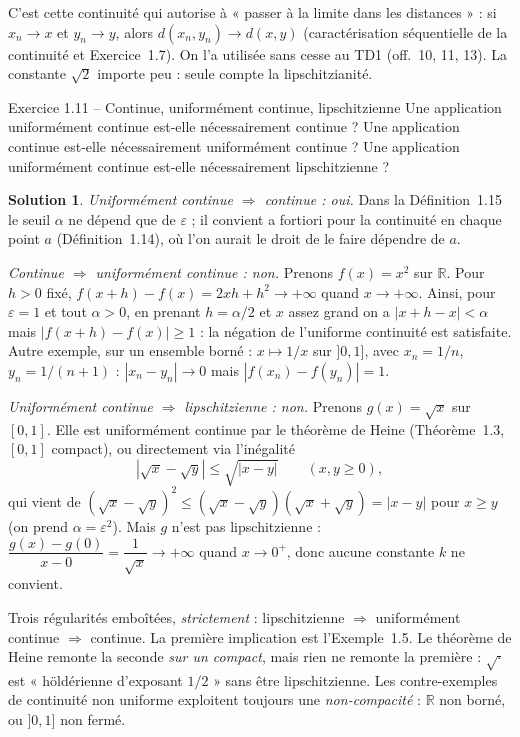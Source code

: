 \documentclass[11pt,a4paper]{article}
\newcommand{\R}{\mathbb{R}}
\newcommand{\abs}[1]{\left|#1\right|}
\theoremstyle{definition}
\newtheorem*{solution}{Solution}
\begin{document}
\begin{commentaire}
C'est cette continuité qui autorise à « passer à la limite dans les distances » : si $x_n\to x$ et $y_n\to y$, alors $d(x_n,y_n)\to d(x,y)$ (caractérisation séquentielle de la continuité et Exercice~1.7). On l'a utilisée sans cesse au TD1 (off.~10, 11, 13). La constante $\sqrt2$ importe peu : seule compte la lipschitzianité.
\end{commentaire}

\begin{exo}{Exercice 1.11 -- Continue, uniformément continue, lipschitzienne}
Une application uniformément continue est-elle nécessairement continue ? Une application continue est-elle nécessairement uniformément continue ? Une application uniformément continue est-elle nécessairement lipschitzienne ?
\end{exo}

\begin{solution}
\emph{Uniformément continue $\Rightarrow$ continue : oui.} Dans la Définition~1.15 le seuil $\alpha$ ne dépend que de $\varepsilon$ ; il convient a fortiori pour la continuité en chaque point $a$ (Définition~1.14), où l'on aurait le droit de le faire dépendre de $a$.

\emph{Continue $\Rightarrow$ uniformément continue : non.} Prenons $f(x)=x^2$ sur $\R$. Pour $h>0$ fixé, $f(x+h)-f(x)=2xh+h^2\to+\infty$ quand $x\to+\infty$. Ainsi, pour $\varepsilon=1$ et tout $\alpha>0$, en prenant $h=\alpha/2$ et $x$ assez grand on a $|x+h-x|<\alpha$ mais $|f(x+h)-f(x)|\ge1$ : la négation de l'uniforme continuité est satisfaite. Autre exemple, sur un ensemble borné : $x\mapsto1/x$ sur $]0,1]$, avec $x_n=1/n$, $y_n=1/(n+1)$ : $|x_n-y_n|\to0$ mais $|f(x_n)-f(y_n)|=1$.

\emph{Uniformément continue $\Rightarrow$ lipschitzienne : non.} Prenons $g(x)=\sqrt x$ sur $[0,1]$. Elle est uniformément continue par le théorème de Heine (Théorème~1.3, $[0,1]$ compact), ou directement via l'inégalité
\[
\abs{\sqrt x-\sqrt y}\le\sqrt{|x-y|}\qquad(x,y\ge0),
\]
qui vient de $(\sqrt x-\sqrt y)^2\le(\sqrt x-\sqrt y)(\sqrt x+\sqrt y)=|x-y|$ pour $x\ge y$ (on prend $\alpha=\varepsilon^2$). Mais $g$ n'est pas lipschitzienne : $\dfrac{g(x)-g(0)}{x-0}=\dfrac1{\sqrt x}\to+\infty$ quand $x\to0^+$, donc aucune constante $k$ ne convient.
\end{solution}

\begin{pointcle}
Trois régularités emboîtées, \emph{strictement} : lipschitzienne $\Rightarrow$ uniformément continue $\Rightarrow$ continue. La première implication est l'Exemple~1.5. Le théorème de Heine remonte la seconde \emph{sur un compact}, mais rien ne remonte la première : $\sqrt{\cdot}$ est « höldérienne d'exposant $1/2$ » sans être lipschitzienne. Les contre-exemples de continuité non uniforme exploitent toujours une \emph{non-compacité} : $\R$ non borné, ou $]0,1]$ non fermé.
\end{pointcle}
\end{document}

